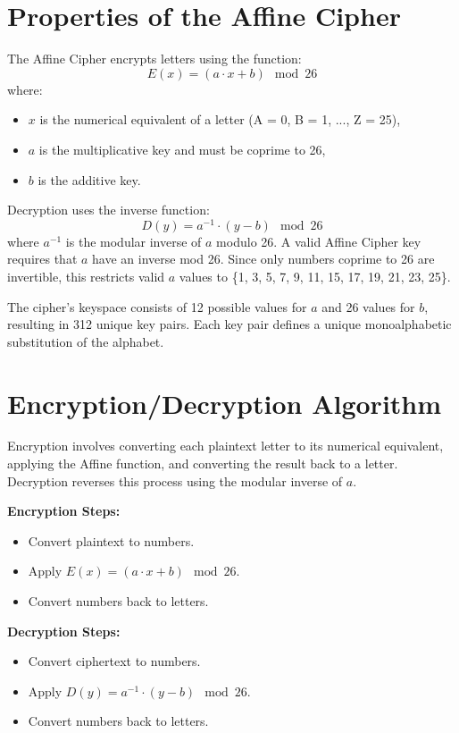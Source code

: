 \documentclass[12pt]{article}
\begin{document}
\section*{Properties of the Affine Cipher}
The Affine Cipher encrypts letters using the function:
\[
E(x) = (a \cdot x + b) \mod 26
\]
where:
\begin{itemize}
    \item \( x \) is the numerical equivalent of a letter (A = 0, B = 1, ..., Z = 25),
    \item \( a \) is the multiplicative key and must be coprime to 26,
    \item \( b \) is the additive key.
\end{itemize}
Decryption uses the inverse function:
\[
D(y) = a^{-1} \cdot (y - b) \mod 26
\]
where \( a^{-1} \) is the modular inverse of \( a \) modulo 26. A valid Affine Cipher key requires that \( a \) have an inverse mod 26. Since only numbers coprime to 26 are invertible, this restricts valid \( a \) values to \{1, 3, 5, 7, 9, 11, 15, 17, 19, 21, 23, 25\}.

The cipher's keyspace consists of 12 possible values for \( a \) and 26 values for \( b \), resulting in 312 unique key pairs. Each key pair defines a unique monoalphabetic substitution of the alphabet.

\section*{Encryption/Decryption Algorithm}
Encryption involves converting each plaintext letter to its numerical equivalent, applying the Affine function, and converting the result back to a letter. Decryption reverses this process using the modular inverse of \( a \).

\textbf{Encryption Steps:}
\begin{itemize}
    \item Convert plaintext to numbers.
    \item Apply \( E(x) = (a \cdot x + b) \mod 26 \).
    \item Convert numbers back to letters.
\end{itemize}

\textbf{Decryption Steps:}
\begin{itemize}
    \item Convert ciphertext to numbers.
    \item Apply \( D(y) = a^{-1} \cdot (y - b) \mod 26 \).
    \item Convert numbers back to letters.
\end{itemize}
\end{document}
